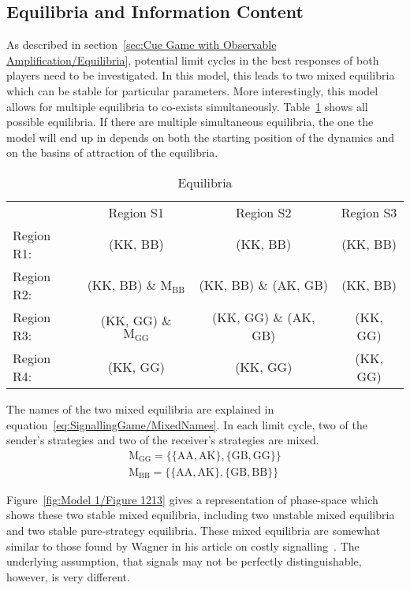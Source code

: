 \documentclass[a4paper,12pt]{article}
\numberwithin{equation}{section}
\begin{document}
\subsection{Equilibria and Information Content}
\label{sec:Signalling Game/Equilibria}

As described in section~\ref{sec:Cue Game with Observable Amplification/Equilibria}, potential limit cycles in the best responses of both players need to be investigated. In this model, this leads to two mixed equilibria which can be stable for particular parameters. More interestingly, this model allows for multiple equilibria to co-exists simultaneously. Table~\ref{tab:SignallingGame/Equilibria} shows all possible equilibria. If there are multiple simultaneous equilibria, the one the model will end up in depends on both the starting position of the dynamics and on the basins of attraction of the equilibria.

\begin{table}[h]
\begin{center}
\begin{tabular}{lccc}
 & Region S1 & Region S2 & Region S3\\
Region R1: & (KK, BB) & (KK, BB) & (KK, BB)\\
Region R2: & (KK, BB) \& $\text{M}_{\text{BB}}$ & (KK, BB) \& (AK, GB) & (KK, BB)\\
Region R3: & (KK, GG) \& $\text{M}_{\text{GG}}$ & (KK, GG) \& (AK, GB) & (KK, GG)\\
Region R4: & (KK, GG) & (KK, GG) & (KK, GG)
\end{tabular}
\end{center}
\caption{Equilibria}
\label{tab:SignallingGame/Equilibria}
\end{table}

The names of the two mixed equilibria are explained in equation~\ref{eq:SignallingGame/MixedNames}. In each limit cycle, two of the sender's strategies and two of the receiver's strategies are mixed.
\begin{subequations}
\label{eq:SignallingGame/MixedNames}
\begin{gather}
\text{M}_{\text{GG}}= \{\{\text{AA}, \text{AK}\}, \{\text{GB}, \text{GG}\}\}\\
\text{M}_{\text{BB}}= \{\{\text{AA}, \text{AK}\}, \{\text{GB}, \text{BB}\}\}
\end{gather}
\end{subequations}

Figure~\ref{fig:Model 1/Figure 1213} gives a representation of phase-space which shows these two stable mixed equilibria, including two unstable mixed equilibria and two stable pure-strategy equilibria. These mixed equilibria are somewhat similar to those found by Wagner in his article on costly signalling~\cite{Wagner2013}. The underlying assumption, that signals may not be perfectly distinguishable, however, is very different.
\end{document}
